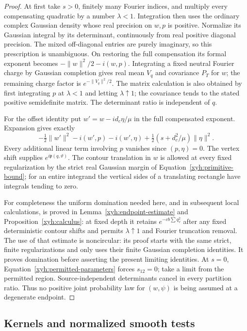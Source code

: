 \begin{proof}
At first take $s>0$, finitely many Fourier indices, and multiply every
compensating quadratic by a number $\lambda<1$. Integration then uses the
ordinary complex Gaussian density whose real precision on $w,p$ is
positive. Normalize its Gaussian integral by its determinant, continuously
from real positive diagonal precision. The mixed off-diagonal entries are
purely imaginary, so this prescription is unambiguous. On restoring the
full compensation its formal exponent becomes
$-\|w\|^2/2-i(w,p)$. Integrating a fixed neutral Fourier charge by Gaussian
completion gives real mean $V_q$ and covariance $P_T$ for $w$; the
remaining charge factor is $e^{-\|V_q\|^2/2}$. The matrix calculation is
also obtained by first integrating $p$ at $\lambda<1$ and letting
$\lambda\uparrow1$; the covariance tends to the stated positive
semidefinite matrix. The determinant ratio is independent of $q$.

For the offset identity put $w'=w-i d_c\eta/\mu$ in the full compensated
exponent. Expansion gives exactly
\[
 -\tfrac12\|w'\|^2-i(w',p)-i(w',\eta)
       +\tfrac12(s+d_c^2/\mu)\|\eta\|^2.
\]
Every additional linear term involving $p$ vanishes since $(p,\eta)=0$.
The vertex shift supplies $e^{i\mathfrak p(q,\vartheta)}$.
The contour translation in $w$ is allowed at every fixed regularization
by the strict real Gaussian margin of
Equation~\eqref{xyh:primitive-bound}; for an entire integrand the vertical
sides of a translating rectangle have integrals tending to zero.

For completeness the uniform domination needed here, and in subsequent
local calculations, is proved in Lemma~\ref{xyh:endpoint-estimate} and
Proposition~\ref{xyh:calculus}: at fixed depth it retains
$e^{-c b\sum q_v^2}$ after any fixed deterministic contour shifts and
permits $\lambda\uparrow1$ and Fourier truncation removal. The use of that
estimate is noncircular: its proof starts with the same strict, finite
regularizations and only uses their finite Gaussian completion identities.
It proves domination before asserting the present limiting identities.
At $s=0$, Equation~\eqref{xyh:permitted-parameters} forces $s_{12}=0$;
take a limit from the permitted region. Source-independent determinants
cancel in every partition ratio. Thus no positive joint probability law
for $(w,\psi)$ is being assumed at a degenerate endpoint.
\end{proof}

\subsection{Kernels and normalized smooth tests}

